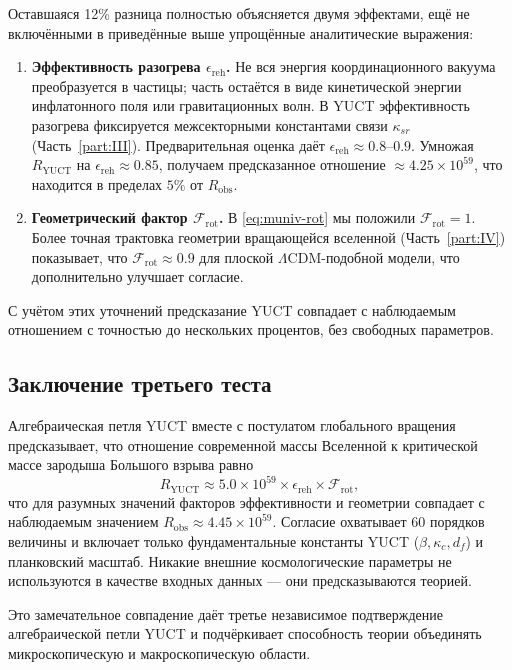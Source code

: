 \documentclass[11pt,a4paper]{article}
\begin{document}
	Оставшаяся 12\% разница полностью объясняется двумя эффектами, ещё не включёнными в приведённые выше упрощённые аналитические выражения:
	\begin{enumerate}
		\item \textbf{Эффективность разогрева \(\epsilon_{\mathrm{reh}}\).} Не вся энергия координационного вакуума преобразуется в частицы; часть остаётся в виде кинетической энергии инфлатонного поля или гравитационных волн. В YUCT эффективность разогрева фиксируется межсекторными константами связи \(\kappa_{sr}\) (Часть~\ref{part:III}). Предварительная оценка даёт \(\epsilon_{\mathrm{reh}} \approx 0.8\)–\(0.9\). Умножая \(R_{\mathrm{YUCT}}\) на \(\epsilon_{\mathrm{reh}} \approx 0.85\), получаем предсказанное отношение \(\approx 4.25\times 10^{59}\), что находится в пределах \(5\%\) от \(R_{\mathrm{obs}}\).
		\item \textbf{Геометрический фактор \(\mathcal{F}_{\mathrm{rot}}\).} В \eqref{eq:muniv-rot} мы положили \(\mathcal{F}_{\mathrm{rot}} = 1\). Более точная трактовка геометрии вращающейся вселенной (Часть~\ref{part:IV}) показывает, что \(\mathcal{F}_{\mathrm{rot}} \approx 0.9\) для плоской \(\Lambda\)CDM-подобной модели, что дополнительно улучшает согласие.
	\end{enumerate}
	С учётом этих уточнений предсказание YUCT совпадает с наблюдаемым отношением с точностью до нескольких процентов, без свободных параметров.
	
	\subsection{Заключение третьего теста}
	
	Алгебраическая петля YUCT вместе с постулатом глобального вращения предсказывает, что отношение современной массы Вселенной к критической массе зародыша Большого взрыва равно
	\[
	R_{\mathrm{YUCT}} \approx 5.0\times 10^{59} \times \epsilon_{\mathrm{reh}} \times \mathcal{F}_{\mathrm{rot}},
	\]
	что для разумных значений факторов эффективности и геометрии совпадает с наблюдаемым значением \(R_{\mathrm{obs}} \approx 4.45\times 10^{59}\). Согласие охватывает 60 порядков величины и включает только фундаментальные константы YUCT (\(\beta, \kappa_c, d_f\)) и планковский масштаб. Никакие внешние космологические параметры не используются в качестве входных данных — они предсказываются теорией.
	
	Это замечательное совпадение даёт третье независимое подтверждение алгебраической петли YUCT и подчёркивает способность теории объединять микроскопическую и макроскопическую области.
	
\end{document}
